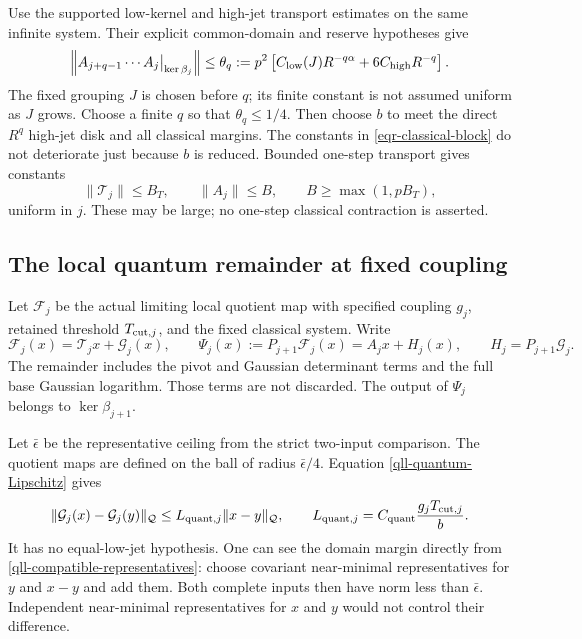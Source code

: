 \documentclass[11pt]{article}
\theoremstyle{remark}
\begin{document}
Use the supported low-kernel and high-jet transport estimates on the
same infinite system. Their explicit common-domain and reserve
hypotheses give
\begin{equation}
 \left\|A_{j+q-1}\cdots A_j\big|_{\ker\beta_j}\right\|
 \le\theta_q:=
 p^2\left[C_{\rm low}(J)R^{-q\alpha}
                     +6C_{\rm high}R^{-q}\right].
 \label{eqr-classical-block}
\end{equation}
The fixed grouping $J$ is chosen before $q$; its finite constant is
not assumed uniform as $J$ grows. Choose a finite $q$ so that
$\theta_q\le1/4$. Then choose $b$ to meet the direct $R^q$
high-jet disk and all classical margins. The constants in
\eqref{eqr-classical-block} do not deteriorate just because $b$
is reduced. Bounded one-step transport gives constants
\begin{equation}
 \|\mathcal T_j\|\le B_T,\qquad
                 \|A_j\|\le B,\qquad B\ge\max(1,pB_T),
 \label{eqr-one-step-linear}
\end{equation}
uniform in $j$. These may be large; no one-step classical
contraction is asserted.

\subsection{The local quantum remainder at fixed coupling}
\label{eqr-quantum-section}

Let $\mathcal F_j$ be the actual limiting local quotient map with
specified coupling $g_j$, retained threshold $T_{{\rm cut},j}$,
and the fixed classical system. Write
\begin{equation}
 \mathcal F_j(x)=\mathcal T_jx+\mathcal G_j(x),\qquad
 \Psi_j(x):=P_{j+1}\mathcal F_j(x)=A_jx+H_j(x),
 \qquad H_j=P_{j+1}\mathcal G_j.
 \label{eqr-quantum-split}
\end{equation}
The remainder includes the pivot and Gaussian determinant terms and
the full base Gaussian logarithm. Those terms are not discarded.
The output of $\Psi_j$ belongs to $\ker\beta_{j+1}$.

Let $\bar\epsilon$ be the representative ceiling from the strict
two-input comparison. The quotient maps are defined on the ball of
radius $\bar\epsilon/4$. Equation
\eqref{qll-quantum-Lipschitz} gives
\begin{equation}
 \|\mathcal G_j(x)-\mathcal G_j(y)\|_{\mathcal Q}
 \le L_{{\rm quant},j}\|x-y\|_{\mathcal Q},\qquad
 L_{{\rm quant},j}
       =C_{\rm quant}\frac{g_jT_{{\rm cut},j}}b.
 \label{eqr-quantum-lipschitz}
\end{equation}
It has no equal-low-jet hypothesis. One can see the domain margin
directly from \eqref{qll-compatible-representatives}: choose
covariant near-minimal representatives for $y$ and $x-y$ and add
them. Both complete inputs then have norm less than
$\bar\epsilon$. Independent near-minimal representatives for $x$
and $y$ would not control their difference.
\end{document}
